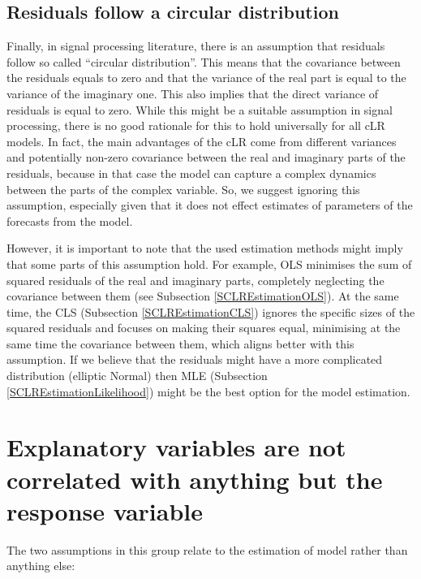 \documentclass[
]{book}
\begin{document}
\hypertarget{residuals-follow-a-circular-distribution}{%
\subsection{Residuals follow a circular distribution}\label{residuals-follow-a-circular-distribution}}

Finally, in signal processing literature, there is an assumption that residuals follow so called ``circular distribution''. This means that the covariance between the residuals equals to zero and that the variance of the real part is equal to the variance of the imaginary one. This also implies that the direct variance of residuals is equal to zero. While this might be a suitable assumption in signal processing, there is no good rationale for this to hold universally for all cLR models. In fact, the main advantages of the cLR come from different variances and potentially non-zero covariance between the real and imaginary parts of the residuals, because in that case the model can capture a complex dynamics between the parts of the complex variable. So, we suggest ignoring this assumption, especially given that it does not effect estimates of parameters of the forecasts from the model.

However, it is important to note that the used estimation methods might imply that some parts of this assumption hold. For example, OLS minimises the sum of squared residuals of the real and imaginary parts, completely neglecting the covariance between them (see Subsection \ref{SCLREstimationOLS}). At the same time, the CLS (Subsection \ref{SCLREstimationCLS}) ignores the specific sizes of the squared residuals and focuses on making their squares equal, minimising at the same time the covariance between them, which aligns better with this assumption. If we believe that the residuals might have a more complicated distribution (elliptic Normal) then MLE (Subsection \ref{SCLREstimationLikelihood}) might be the best option for the model estimation.

\hypertarget{explanatory-variables-are-not-correlated-with-anything-but-the-response-variable}{%
\section{Explanatory variables are not correlated with anything but the response variable}\label{explanatory-variables-are-not-correlated-with-anything-but-the-response-variable}}

The two assumptions in this group relate to the estimation of model rather than anything else:
\end{document}
